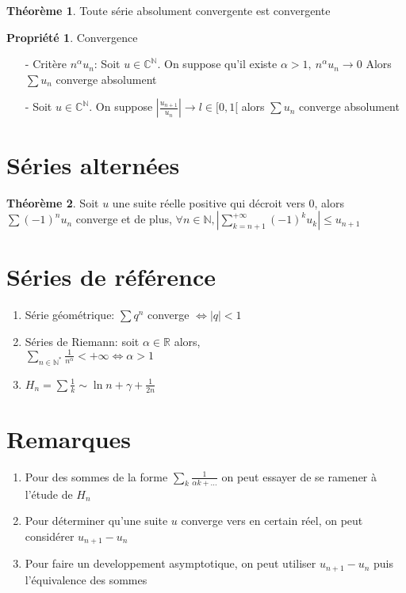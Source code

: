 \documentclass[fleqn]{article}
\theoremstyle{definition} \newtheorem*{defi}{D\'efinition}
\theoremstyle{definition} \newtheorem*{theo}{Th\'eor\`eme}
\theoremstyle{definition} \newtheorem*{coro}{Corollaire}
\theoremstyle{remark} \newtheorem*{rqs}{Remarques}
\theoremstyle{definition} \newtheorem*{prop}{Propri\'et\'e}
\begin{document}
\begin{theo} Toute s\'erie absolument convergente est convergente

\begin{prop} Convergence
	\begin{enumerate}
		\item [-] Crit\`ere $n^\alpha u_n$: Soit $u \in \mathbb{C}^\mathbb{N}$. On suppose qu'il existe $\alpha > 1,\ n^\alpha u_n \rightarrow 0$
			Alors $\sum u_n $ converge absolument
		\item [-] Soit $u \in \mathbb{C}^\mathbb{N}$. On suppose $|\frac{u_{n+1}}{u_n}| \rightarrow l \in [0,1[$ alors $\sum u_n$ converge
			absolument
	\end{enumerate}
\end{prop}

\end{theo}


\section{Séries altern\'ees}
\begin{theo}
	Soit $u$ une suite r\'eelle positive qui d\'ecroit vers $0$, alors $\sum (-1)^n u_n$ converge et de plus, $\forall n \in \mathbb{N},
	|\sum_{k=n+1}^{+\infty} (-1)^k u_k| \leq u_{n+1}$
\end{theo}


\section{S\'eries de r\'ef\'erence}
\begin{enumerate}
	\item S\'erie g\'eom\'etrique: $\sum q^n$ converge $\Leftrightarrow |q| < 1$
	\item S\'eries de Riemann: soit $\alpha \in \mathbb{R}$ alors,\\
		$\sum_{n \in \mathbb{N}^*} \frac{1}{n^\alpha} < +\infty \Leftrightarrow \alpha > 1$
	\item $H_n = \sum \frac{1}{k} \sim \ln n + \gamma + \frac{1}{2n}$
\end{enumerate}

\section{Remarques}
\begin{enumerate}
	\item Pour des sommes de la forme $\sum_k \frac{1}{\alpha k + \hdots}$ on peut essayer de se ramener \`a l'\'etude de $H_n$
	\item Pour d\'eterminer qu'une suite $u$ converge vers en certain r\'eel, on peut consid\'erer $u_{n+1} - u_n$
	\item Pour faire un developpement asymptotique, on peut utiliser $u_{n+1} - u_n$ puis l'\'equivalence des sommes
\end{enumerate}
\end{document}

